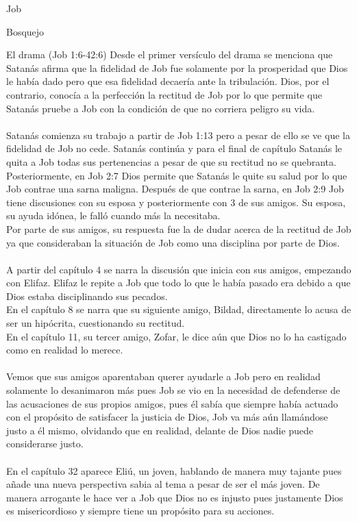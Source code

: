 \begin{section}{Job}
\begin{subsection}{Bosquejo}
\begin{subsubsection}{El drama (Job 1:6-42:6)}
			Desde el primer versículo del drama se menciona que Satanás afirma que la fidelidad de Job fue solamente por la prosperidad que Dios le había dado pero que esa fidelidad decaería ante la tribulación. Dios, por el contrario, conocía a la perfección la rectitud de Job por lo que permite que Satanás pruebe a Job con la condición de que no corriera peligro su vida.\\
\\
Satanás comienza su trabajo a partir de Job 1:13 pero a pesar de ello se ve que la fidelidad de Job no cede. Satanás continúa y para el final de capítulo Satanás le quita a Job todas sus pertenencias a pesar de que su rectitud no se quebranta.\\
Posteriormente, en Job 2:7 Dios permite que Satanás le quite su salud por lo que Job contrae una sarna maligna. Después de que contrae la sarna, en Job 2:9 Job tiene discusiones con su esposa y posteriormente con 3 de sus amigos. 
\newpage
Su esposa, su ayuda idónea, le falló cuando más la necesitaba.\\
Por parte de sus amigos, su respuesta fue la de dudar acerca de la rectitud de Job ya que consideraban la situación de Job como una disciplina por parte de Dios.\\
\\
	A partir del capítulo 4 se narra la discusión que inicia con sus amigos, empezando con  Elifaz. Elifaz le repite a Job que todo lo que le había pasado era debido a que Dios estaba disciplinando sus pecados.\\
En el capítulo 8 se narra que su siguiente amigo, Bildad, directamente lo acusa de ser un hipócrita, cuestionando su rectitud.\\
En el capítulo 11, su tercer amigo, Zofar, le dice aún que Dios no lo ha castigado como en realidad lo merece.\\
\\
Vemos que sus amigos aparentaban querer ayudarle a Job pero en realidad solamente lo desanimaron más pues Job se vio en la necesidad de defenderse de las acusaciones de sus propios amigos, pues él sabía que siempre había actuado con el propósito de satisfacer la justicia de Dios, Job va más aún llamándose justo a él mismo, olvidando que en realidad, delante de Dios nadie puede considerarse justo.\\
\\
 En el capítulo 32 aparece Eliú, un joven, hablando de manera muy tajante pues añade una nueva perspectiva sabia al tema a pesar de ser el más joven. De manera arrogante le hace ver a Job que Dios no es injusto pues justamente Dios es misericordioso y siempre tiene un propósito para su acciones.\\

\end{subsubsection}
\end{subsection}
\end{section}
